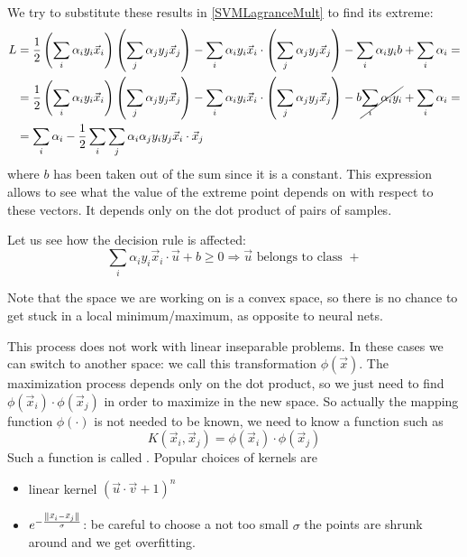 We try to substitute these results in \autoref{SVMLagranceMult} to find its extreme:
\begin{equation}
\begin{aligned}
L &= \frac{1}{2} \left(  \sum_i \alpha_i y_i \vec{x}_i\right) \left( \sum_j \alpha_j y_j \vec{x}_j\right) - \sum_i \alpha_i y_i \vec{x}_i \cdot\left(\sum_j \alpha_j y_j \vec{x}_j\right) -\sum_i \alpha_i y_i b + \sum_i \alpha_i =\\
& = \frac{1}{2} \left(  \sum_i \alpha_i y_i \vec{x}_i\right) \left( \sum_j \alpha_j y_j \vec{x}_j\right) - \sum_i \alpha_i y_i \vec{x}_i \cdot\left(\sum_j \alpha_j y_j \vec{x}_j\right) -b \cancel{\sum_i \alpha_i y_i} + \sum_i \alpha_i  =\\
&= \sum_i \alpha_i - \frac{1}{2}\sum_i \sum_j \alpha_i \alpha_j y_i y_j \vec{x}_i \cdot \vec{x}_j 
\end{aligned}
\end{equation}
where $b$ has been taken out of the sum since it is a constant. This expression allows to see what the value of the extreme point depends on with respect to these vectors. It depends only on the dot product of pairs of samples.

Let us see how the decision rule is affected:
\begin{equation}
\sum_i \alpha_i y_i \vec{x}_i \cdot \vec{u} + b \ge 0 \Rightarrow \vec{u} \text{ belongs to class } +
\end{equation}

Note that the space we are working on is a convex space, so there is no chance to get stuck in a local minimum/maximum, as opposite to neural nets.

This process does not work with linear inseparable problems. In these cases we can switch to another space: we call this transformation $\phi(\vec{x})$. The maximization process depends only on the dot product, so we just need to find $\phi(\vec{x}_i)\cdot \phi(\vec{x}_j)$ in order to maximize in the new space. So actually the mapping function $\phi(\cdot)$ is not needed to be known, we need to know a function such as
\begin{equation}
K(\vec{x}_i, \vec{x}_j) = \phi(\vec{x}_i)\cdot \phi(\vec{x}_j)
\end{equation} 
Such a function is called . Popular choices of kernels are
\begin{itemize}
\item linear kernel $\left(\vec{u} \cdot \vec{v}+1\right)^n$
\item $e^{-\frac{\left\lVert\vec{x}_i - \vec{x}_j\right\rVert}{\sigma}}$: be careful to choose a not too small $\sigma$ the points are shrunk around and we get overfitting.
\end{itemize}

